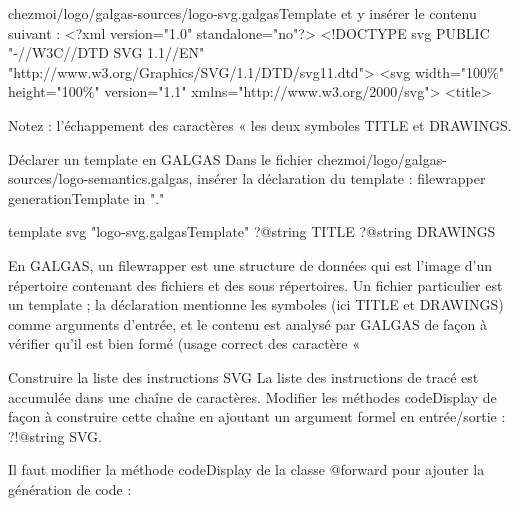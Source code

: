 chezmoi/logo/galgas-sources/logo-svg.galgasTemplate 
et y insérer le contenu suivant :
<?xml version="1.0" standalone="no"?>
<!DOCTYPE svg PUBLIC "-//W3C//DTD SVG 1.1//EN" "http://www.w3.org/Graphics/SVG/1.1/DTD/svg11.dtd">
<svg width="100\%" height="100\%" version="1.1" xmlns="http://www.w3.org/2000/svg">
<title>%

Notez :
l'échappement des caractères « %
les deux symboles TITLE et DRAWINGS.

Déclarer un template en GALGAS
Dans le fichier chezmoi/logo/galgas-sources/logo-semantics.galgas, insérer la déclaration du template :
filewrapper generationTemplate in "." {
} {
} {

template svg "logo-svg.galgasTemplate"
?@string TITLE
?@string DRAWINGS
}

En GALGAS, un filewrapper est une structure de données qui est l'image d'un répertoire contenant des fichiers et des sous répertoires. Un fichier particulier est un template ; la déclaration mentionne les symboles (ici TITLE et DRAWINGS) comme arguments d'entrée, et le contenu est analysé par GALGAS de façon à vérifier qu'il est bien formé (usage correct des caractère « 


Construire la liste des instructions SVG
La liste des instructions de tracé est accumulée dans une chaîne de caractères. Modifier les méthodes codeDisplay de façon à construire cette chaîne en ajoutant un argument formel en entrée/sortie : ?!@string SVG.

Il faut modifier la méthode codeDisplay de la classe @forward pour ajouter la génération de code :



